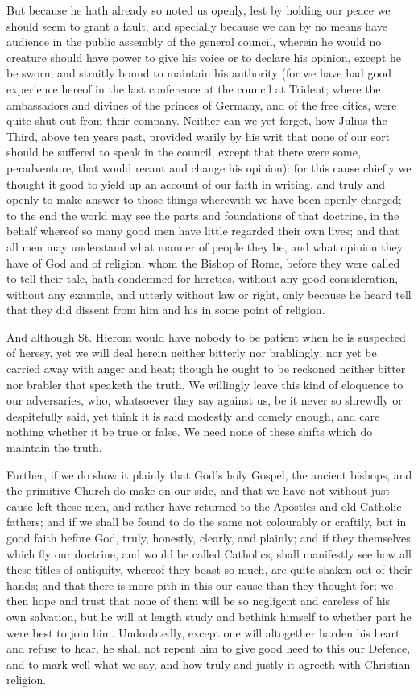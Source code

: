 But because he hath already so noted us openly, lest by holding our
peace we should seem to grant a fault, and specially because we can
by no means have
audience in the public assembly of the general council, wherein he would
no creature should have power to give his voice or to declare his opinion,
except he be sworn, and straitly bound to maintain his authority (for
we have had good experience hereof in the last conference at the council
at Trident; where the ambassadors and divines of the princes of Germany,
and of the free cities, were quite shut out from their company.
Neither can we yet forget, how Julius the Third, above ten years past,
provided warily by his writ that none of our sort should be suffered
to speak in the council, except that there were some, peradventure,
that would recant and change his opinion): for this cause chiefly we
thought it good to yield up an account of our faith in writing, and
truly and openly to make answer to those things wherewith we have been
openly charged; to the end the world may see the parts and foundations
of that doctrine, in the behalf whereof so many good men have little
regarded their own lives; and that all men may understand what manner
of people they be, and what opinion they have of God and of religion,
whom the Bishop of Rome, before they were called to tell their tale,
hath condemned for heretics, without any good consideration, without
any example, and utterly without law or right, only because
he heard tell that they did dissent from him and his in some point of
religion.

And although St. Hierom would have nobody to be patient when he is
suspected of heresy, yet we will deal herein neither bitterly nor brablingly;
nor yet be carried away with anger and heat; though he ought to be reckoned
neither bitter nor brabler that speaketh the truth. We willingly
leave this kind of eloquence to our adversaries, who, whatsoever they
say against us, be it never so shrewdly or despitefully said, yet think
it is said modestly and comely enough, and care nothing whether it be
true or false. We need none of these shifts which do maintain
the truth.

Further, if we do show it plainly that God’s holy Gospel, the
ancient bishops, and the primitive Church do make on our side, and that
we have not without just cause left these men, and rather have returned
to the Apostles and old Catholic fathers; and if we shall be found to
do the same not colourably or craftily, but in good faith before God,
truly, honestly, clearly, and plainly; and if they themselves which
fly our doctrine, and would be called Catholics, shall manifestly see
how all these titles of antiquity, whereof they boast so much, are quite
shaken out of their hands; and that there is more pith in this our cause
than they thought for; we
then hope and trust that none of them will be so negligent and careless
of his own salvation, but he will at length study and bethink himself
to whether part he were best to join him. Undoubtedly, except
one will altogether harden his heart and refuse to hear, he shall not
repent him to give good heed to this our Defence, and to mark well what
we say, and how truly and justly it agreeth with Christian religion.

